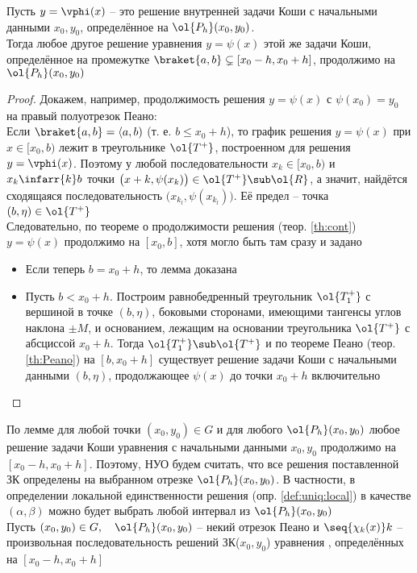\begin{lemma}
    Пусть $ y = \vphi(x) $ -- это решение внутренней задачи Коши с начальными данными $ x_0, y_0 $, определённое на $ \ol{P_h}(x_0, y_0) $. \\
    Тогда любое другое решение уравнения  $ y = \psi(x) $ этой же задачи Коши, определённое на промежутке $ \braket{a, b} \subsetneq [x_0 - h, x_0 + h] $, продолжимо на $ \ol{P_h}(x_0, y_0) $
\end{lemma}

\begin{proof}
	Докажем, например, продолжимость решения $ y = \psi(x) $ с $ \psi(x_0) = y_0 $ на правый полуотрезок Пеано: \\
    Если $ \braket{a, b} = \langle a, b) $ (т. е. $ b \le x_0 + h $), то график решения $ y = \psi(x) $ при $ x \in [x_0, b) $ лежит в треугольнике $ \ol{T^+} $, построенном для решения $ y = \vphi(x) $. Поэтому у любой последовательности $ x_k \in [x_0, b) $ и $ x_k \infarr{k} b $ точки $ \big( x+k, \psi(x_k) \big) \in \ol{T^+} \sub \ol{R} $, а значит, найдётся сходящаяся последовательность $ \big( x_{k_l}, \psi(x_{k_l}) \big) $. Её предел -- точка $ (b, \eta) \in \ol{T^+} $ \\
    Следовательно, по теореме о продолжимости решения (теор. \ref{th:cont}) $ y = \psi(x) $ продолжимо на $ [x_0, b] $, хотя могло быть там сразу и задано
    \begin{itemize}
        \item Если теперь $ b = x_0 + h $, то лемма доказана
        \item Пусть $ b < x_0 + h $. Построим равнобедренный треугольник $ \ol{T_1^+} $ с вершиной в точке $ (b, \eta) $, боковыми сторонами, имеющими тангенсы углов наклона $ \pm M $, и основанием, лежащим на основании треугольника $ \ol{T^+} $ с абсциссой $ x_0 + h $. Тогда $ \ol{T_1^+} \sub \ol{T^+} $ и по теореме Пеано (теор. \ref{th:Peano}) на $ [b, x_0 + h] $ существует решение задачи Коши с начальными данными $ (b, \eta) $, продолжающее $ \psi(x) $ до точки $ x_0 + h $ включительно
    \end{itemize}
\end{proof}

По лемме для любой точки $ (x_0, y_0) \in G $ и для любого $ \ol{P_h}(x_0, y_0) $ любое решение задачи Коши уравнения  с начальными данными $ x_0, y_0 $ продолжимо на $ [x_0 - h, x_0 + h] $. Поэтому, НУО будем считать, что все решения поставленной ЗК определены на выбранном отрезке $ \ol{P_h}(x_0, y_0) $. В частности, в определении локальной единственности решения (опр. \ref{def:uniq:local}) в качестве $ (\alpha, \beta) $ можно будет выбрать любой интервал из $ \ol{P_h}(x_0, y_0) $ \\
Пусть $ (x_0, y_0) \in G, \quad \ol{P_h}(x_0, y_0) $ -- некий отрезок Пеано и $ \seq{\chi_k(x)}k $ -- произвольная последовательность решений ЗК($ x_0, y_0 $) уравнения , определённых на $ [x_0 - h, x_0 + h] $

